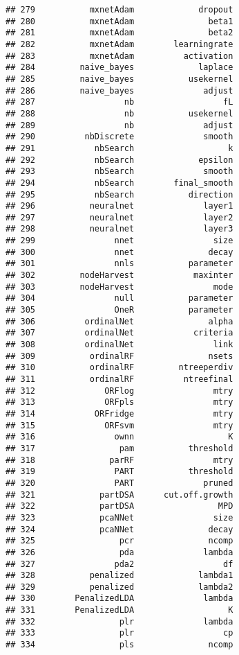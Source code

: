 \documentclass[
]{article}
\begin{document}
\begin{verbatim}
## 279           mxnetAdam             dropout
## 280           mxnetAdam               beta1
## 281           mxnetAdam               beta2
## 282           mxnetAdam        learningrate
## 283           mxnetAdam          activation
## 284         naive_bayes             laplace
## 285         naive_bayes           usekernel
## 286         naive_bayes              adjust
## 287                  nb                  fL
## 288                  nb           usekernel
## 289                  nb              adjust
## 290          nbDiscrete              smooth
## 291            nbSearch                   k
## 292            nbSearch             epsilon
## 293            nbSearch              smooth
## 294            nbSearch        final_smooth
## 295            nbSearch           direction
## 296           neuralnet              layer1
## 297           neuralnet              layer2
## 298           neuralnet              layer3
## 299                nnet                size
## 300                nnet               decay
## 301                nnls           parameter
## 302         nodeHarvest            maxinter
## 303         nodeHarvest                mode
## 304                null           parameter
## 305                OneR           parameter
## 306          ordinalNet               alpha
## 307          ordinalNet            criteria
## 308          ordinalNet                link
## 309           ordinalRF               nsets
## 310           ordinalRF         ntreeperdiv
## 311           ordinalRF          ntreefinal
## 312              ORFlog                mtry
## 313              ORFpls                mtry
## 314            ORFridge                mtry
## 315              ORFsvm                mtry
## 316                ownn                   K
## 317                 pam           threshold
## 318               parRF                mtry
## 319                PART           threshold
## 320                PART              pruned
## 321             partDSA      cut.off.growth
## 322             partDSA                 MPD
## 323             pcaNNet                size
## 324             pcaNNet               decay
## 325                 pcr               ncomp
## 326                 pda              lambda
## 327                pda2                  df
## 328           penalized             lambda1
## 329           penalized             lambda2
## 330        PenalizedLDA              lambda
## 331        PenalizedLDA                   K
## 332                 plr              lambda
## 333                 plr                  cp
## 334                 pls               ncomp

\end{verbatim}
\end{document}
